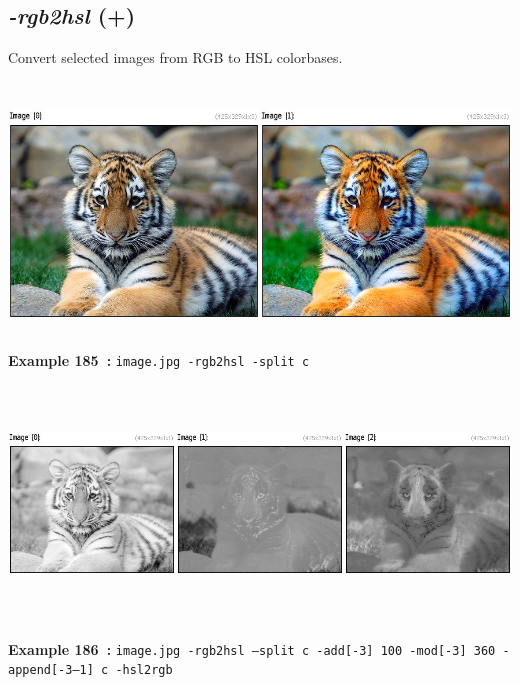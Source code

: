 \documentclass[a4paper,11pt,twoside]{book}
\begin{document}
\subsection{\emph{-rgb2hsl} (+)}\vspace*{-0.5em}
Convert selected images from RGB to HSL colorbases.
\begin{center}\includegraphics[keepaspectratio=true,height=7cm,width=\textwidth]{img/gmic_def185.jpg}\\
{\footnotesize \textbf{Example 185~:} \texttt{image.jpg -rgb2hsl -split c}}
\\\includegraphics[keepaspectratio=true,height=7cm,width=\textwidth]{img/gmic_def186.jpg}\\
{\footnotesize \textbf{Example 186~:} \texttt{image.jpg -rgb2hsl --split c -add[-3] 100 -mod[-3] 360 -append[-3--1] c -hsl2rgb}}
\end{center}
\end{document}
